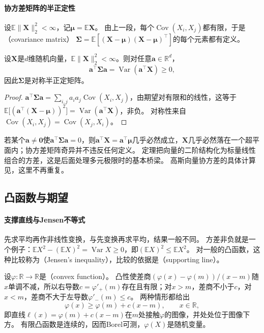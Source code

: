 \paragraph{协方差矩阵的半正定性}
设$\mathbb E\lVert\bm X\rVert_2^2<\infty$，记$\bm\mu=\mathbb E\bm X$。
由上一段，每个$\operatorname{Cov}(X_i,X_j)$都有限，于是（covariance matrix）
$\bm\Sigma=\mathbb E[(\bm X-\bm\mu)(\bm X-\bm\mu)^\top]$的每个元素都有定义。

\begin{theorem}[协方差矩阵半正定]
\label{thm:pmod-covariance-psd}
设$\bm X$是$d$维随机向量，$\mathbb E\lVert\bm X\rVert_2^2<\infty$。则对任意$\bm a\in\mathbb R^d$，
\[
  \bm a^\top\bm\Sigma\bm a=\operatorname{Var}(\bm a^\top\bm X)\ge0,
\]
因此$\bm\Sigma$是对称半正定矩阵。
\end{theorem}

\begin{proof}
$\bm a^\top\bm\Sigma\bm a=\sum_{i,j}a_ia_j\operatorname{Cov}(X_i,X_j)$，由期望对有限和的线性，这等于$\mathbb E\bigl[(\bm a^\top(\bm X-\bm\mu))^2\bigr]=\operatorname{Var}(\bm a^\top\bm X)$，非负。
对称性来自$\operatorname{Cov}(X_i,X_j)=\operatorname{Cov}(X_j,X_i)$。
\end{proof}

若某个$\bm a\ne\bm0$使$\bm a^\top\bm\Sigma\bm a=0$，则$\bm a^\top\bm X=\bm a^\top\bm\mu$几乎必然成立，$\bm X$几乎必然落在一个超平面内；协方差矩阵奇异并不违反任何定义。
定理把向量的二阶结构化为标量线性组合的方差，这是后面处理多元极限时的基本桥梁。
高斯向量协方差的具体计算见，这里不再重复。

\subsection{凸函数与期望}

\paragraph{支撑直线与Jensen不等式}
先求平均再作非线性变换，与先变换再求平均，结果一般不同。
方差非负就是一个例子：$\mathbb EX^2-(\mathbb EX)^2=\operatorname{Var}X\ge0$，即$(\mathbb EX)^2\le\mathbb EX^2$。
对一般的凸函数，这种比较称为（Jensen's inequality），比较的依据是（supporting line）。

设$\varphi:\mathbb R\to\mathbb R$是（convex function）。
凸性使差商$(\varphi(x)-\varphi(m))/(x-m)$随$x$单调不减，所以右导数$c=\varphi'_+(m)$存在且有限；对$x>m$，差商不小于$c$，对$x<m$，差商不大于左导数$\varphi'_-(m)\le c$。
两种情形都给出
\begin{equation}
  \varphi(x)\ge\varphi(m)+c(x-m),\qquad x\in\mathbb R,
  \label{eq:pmod-support-line}
\end{equation}
即直线$\ell(x)=\varphi(m)+c(x-m)$在$m$处接触$\varphi$的图像，并处处位于图像下方。
有限凸函数是连续的，因而Borel可测，$\varphi(X)$是随机变量。

